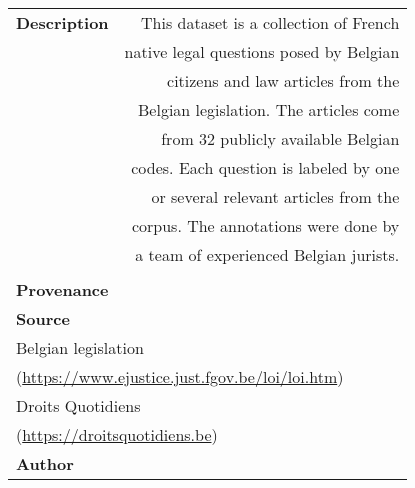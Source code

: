 \documentclass[11pt]{article}
\begin{document}
\begin{table*}[t]
\begin{subtable}[t]{.55\linewidth}
\begin{tabular}{|lr|}
        \textbf{Description} & This dataset is a collection of French                         \\
                             & native legal questions posed by Belgian                      \\
                             & citizens and law articles from the                              \\
                             & Belgian legislation. The articles come                         \\
                             & from 32 publicly available Belgian                        \\
                             & codes. Each question is labeled by one                          \\
                             & or several relevant articles from the                             \\
                             & corpus. The annotations were done by                            \\
                             & a team of experienced Belgian jurists.                         \\\hline
        \multicolumn{2}{l}{}                                                                                                        \\ \hline
        \multicolumn{2}{|l|}{\textbf{\large Provenance}}                                                                            \\ \hline
        \multicolumn{2}{|l|}{\textbf{Source}}                                                                                       \\
        \multicolumn{2}{|l|}{Belgian legislation}                                                                                   \\
        \multicolumn{2}{|l|}{\scriptsize\hspace{0.5cm}(\url{https://www.ejustice.just.fgov.be/loi/loi.htm})}                        \\
        \multicolumn{2}{|l|}{Droits Quotidiens}                                                                                     \\
        \multicolumn{2}{|l|}{\scriptsize\hspace{0.5cm}(\url{https://droitsquotidiens.be})}                                      \\ \hline
        \textbf{Author}      &                                                                                                      \\

\end{tabular}
\end{subtable}
\end{table*}
\end{document}
